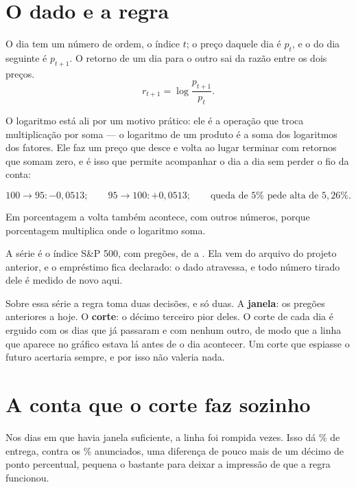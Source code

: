 \section{O dado e a regra}

O dia tem um número de ordem, o índice $t$; o preço daquele dia é $p_t$, e o do dia seguinte é
$p_{t+1}$. O retorno de um dia para o outro sai da razão entre os dois preços.
\[
  r_{t+1} = \log \frac{p_{t+1}}{p_t}.
\]

O logaritmo está ali por um motivo prático: ele é a operação que troca multiplicação por soma
--- o logaritmo de um produto é a soma dos logaritmos dos fatores. Ele faz um preço que desce e
volta ao lugar terminar com retornos que somam zero, e é isso que permite acompanhar o dia a dia
sem perder o fio da conta:

\[ 100 \to 95: -0{,}0513; \qquad 95 \to 100: +0{,}0513; \qquad \text{queda de } 5\% \text{ pede alta de } 5{,}26\% . \] %

Em porcentagem a volta também acontece, com outros números, porque porcentagem multiplica
onde o logaritmo soma.

A série é o índice S\&P 500, %
com \numSerieDias{} pregões, de \numSerieInicio{} a \numSerieFim. Ela vem do arquivo do
projeto anterior, e o empréstimo fica declarado: o dado atravessa, e todo número tirado dele é
medido de novo aqui.

Sobre essa série a regra toma duas decisões, e só duas. A \textbf{janela}: os
\numCorteJanela{} pregões anteriores a hoje. O \textbf{corte}: o décimo terceiro pior deles.
O corte de cada dia é erguido com os dias que já passaram e com nenhum outro, de modo que a
linha que aparece no gráfico estava lá antes de o dia acontecer. Um corte que espiasse o
futuro acertaria sempre, e por isso não valeria nada.

\section{A conta que o corte faz sozinho}

Nos \numEntregaDias{} dias em que havia janela suficiente, a linha foi rompida
\numEntregaViolacoes{} vezes. Isso dá \numEntregaTaxaPct\% de entrega, contra os
\numPromessaPct\% anunciados, uma diferença de pouco mais de um décimo de ponto percentual, pequena o
bastante para deixar a impressão de que a regra funcionou.


